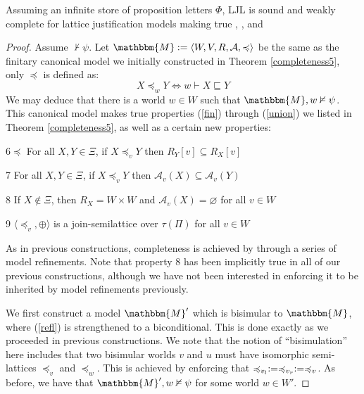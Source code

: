 \begin{theorem}
  \label{completeness6}Assuming an infinite store of proposition letters
  $\Phi$, LJL is sound and weakly complete for lattice justification models
  making true , ,  and
\end{theorem}

\begin{proof}
  Assume $\nvdash \psi$.  Let $\mathbbm{M} \assign \langle W, V, R,
  \mathcal{A}, \preccurlyeq \rangle$ be the same as the finitary canonical
  model we initially constructed in Theorem \ref{completeness5}, only
  $\preccurlyeq$ is defined as:
  \[ X \preccurlyeq_w Y \Longleftrightarrow w \vdash X \sqsubseteq Y \]
  We may deduce that there is a world $w \in W$ such that $\mathbbm{M}, w
  \nvDash \psi$.  This canonical model makes true properties (\ref{fin})
  through (\ref{union}) we listed in Theorem \ref{completeness5}, as well as a
  certain new properties:
  
  \begin{descriptioncompact}
    \item[6$\preccurlyeq$] For all $X, Y \in \Xi$, if $X \preccurlyeq_v Y$
    then $R_Y [v] \subseteq R_X [v]$
    
    \item[7] For all $X, Y \in \Xi$, if $X \preccurlyeq_v Y$ then
    $\mathcal{A}_v (X) \subseteq \mathcal{A}_v (Y)$
    
    \item[8] If $X \nin \Xi$, then $R_X = W \times W$ and $\mathcal{A}_v (X) =
    \varnothing$ for all $v \in W$
    
    \item[9] $\langle \preccurlyeq_v, \oplus \rangle$ is a join-semilattice
    over $\tau (\Pi)$ for all $v \in W$
  \end{descriptioncompact}
  
  As in previous constructions, completeness is achieved by through a series
  of model refinements.  Note that property 8 has been implicitly true in all
  of our previous constructions, although we have not been interested in
  enforcing it to be inherited by model refinements previously.
  
  
  
  We first construct a model $\mathbbm{M}'$ which is bisimular to
  $\mathbbm{M}$, where (\ref{refl}) is strengthened to a biconditional.  This
  is done exactly as we proceeded in previous constructions. We note that the
  notion of ``bisimulation'' here includes that two bisimular worlds $v$ and
  $u$ must have isomorphic semi-lattices $\preccurlyeq_v$ and
  $\preccurlyeq_w$.  This is achieved by enforcing that $\preccurlyeq_{v_l}
  := \preccurlyeq_{v_r} := \preccurlyeq_v$. As before, we have that
  $\mathbbm{M}', w \nvDash \psi$ for some world $w \in W'$.
  

\end{proof}

